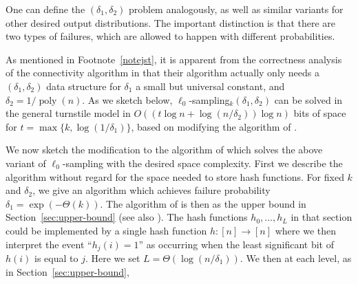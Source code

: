 One can define the $(\delta_1,\delta_2)$ problem analogously, as well as similar variants for other desired output distributions. The important distinction is that there are two types of failures, which are allowed to happen with different probabilities.

As mentioned in Footnote~\ref{notejst}, it is apparent from the correctness analysis of the connectivity algorithm in \cite{AhnGM12a} that their algorithm actually only needs a $(\delta_1,\delta_2)$ data structure for $\delta_1$ a small but universal constant, and $\delta_2 = 1/\mathop{poly}(n)$. As we sketch below, $\ell_0$-sampling$_k(\delta_1,\delta_2)$ can be solved in the general turnstile model in $O((t\log n + \log(n/\delta_2)) \log n)$ bits of space for $t = \max\{k, \log(1/\delta_1)\}$, based on modifying the algorithm of \cite{JowhariST11}.

We now sketch the modification to the algorithm of \cite{JowhariST11} which solves the above variant of $\ell_0$-sampling with the desired space complexity. First we describe the algorithm without regard for the space needed to store hash functions. For fixed $k$ and $\delta_2$, we give an algorithm which achieves failure probability $\delta_1 = \exp(-\Theta(k))$. The algorithm of \cite{JowhariST11} is then as the upper bound in Section~\ref{sec:upper-bound} (see also \cite{CormodeF14}). The hash functions $h_0,\ldots,h_L$ in that section could be implemented by a single hash function $h:[n]\rightarrow[n]$ where we then interpret the event ``$h_j(i) = 1$'' as occurring when the least significant bit of $h(i)$ is equal to $j$. Here we set $L = \Theta(\log(n/\delta_1))$. We then at each level, as in Section~\ref{sec:upper-bound}, 